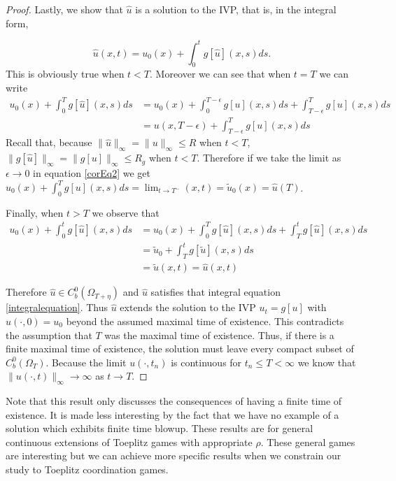 \documentclass[aps,
preprint,
groupedaddress,
showkeys,
amsmath]{revtex4-2}
\begin{document}
\begin{proof}
        Lastly, we show that $\hat{u}$ is a solution to the IVP, that is, in the integral form, 
        
       \begin{equation}\label{integralequation}\hat{u}(x,t)=u_0(x)+\int_0^tg[\hat{u}](x,s)ds.\end{equation}
        This is obviously true when $t<T$. Moreover we can see that when $t=T$ we can write
        \begin{equation}\label{corEq2}
            \begin{split}
            u_0(x)+\int_0^Tg[\hat{u}](x,s)ds&=u_0(x)+\int_0^{T-\epsilon}g[{u}](x,s)ds+\int_{T-\epsilon}^Tg[{u}](x,s)ds\\
                &=u(x,T-\epsilon)+\int_{T-\epsilon}^Tg[u](x,s)ds
            \end{split}
        \end{equation}
        Recall that, because $\|\hat{u}\|_\infty=\|u\|_\infty\leq R$ when $t<T$,  $\|g[\hat{u}]\|_\infty=\|g[u]\|_\infty\leq R_g$ when $t<T$. Therefore if we take the limit as $\epsilon \rightarrow 0$ in equation \eqref{corEq2} we get $u_0(x)+\int_0^Tg[u](x,s)ds=\lim_{t\rightarrow T^-}(x,t)=\tilde{u}_0(x)=\hat{u}(T)$. 

        Finally, when $t>T$ we observe that 
        \begin{equation*}
            \begin{split}
                u_0(x)+\int_0^tg[\hat{u}](x,s)ds&= u_0(x)+\int_0^Tg[\hat{u}](x,s)ds+\int_T^tg[\hat{u}](x,s)ds\\
                &=\tilde{u}_0+\int_T^tg[\tilde{u}](x,s)ds\\
                &=\tilde{u}(x,t)=\hat{u}(x,t)
            \end{split}
        \end{equation*}

        Therefore $\hat{u}\in C^0_b(\Omega_{T+\eta})$ and $\hat{u}$ satisfies that integral equation \eqref{integralequation}. Thus $\hat{u}$ extends the solution to the IVP $u_t=g[u]$ with $u(\cdot,0)=u_0$ beyond the assumed maximal time of existence. This contradicts the assumption that $T$ was the maximal time of existence. Thus, if there is a finite maximal time of existence, the solution must leave every compact subset of $C^0_b(\Omega_T)$. Because the limit $u(\cdot,t_n)$ is continuous for $t_n\leq T<\infty$ we know that $\|u(\cdot, t)\|_\infty\to \infty$ as $t\to T$.
    \end{proof}
    Note that this result only discusses the consequences of having a finite time of existence. It is made less interesting by the fact that we have no example of a solution which exhibits finite time blowup. 
    These results are for general continuous extensions of Toeplitz games with appropriate $\rho$. These general games are interesting but we can achieve more specific results when we constrain our study to Toeplitz coordination games.  
\end{document}
